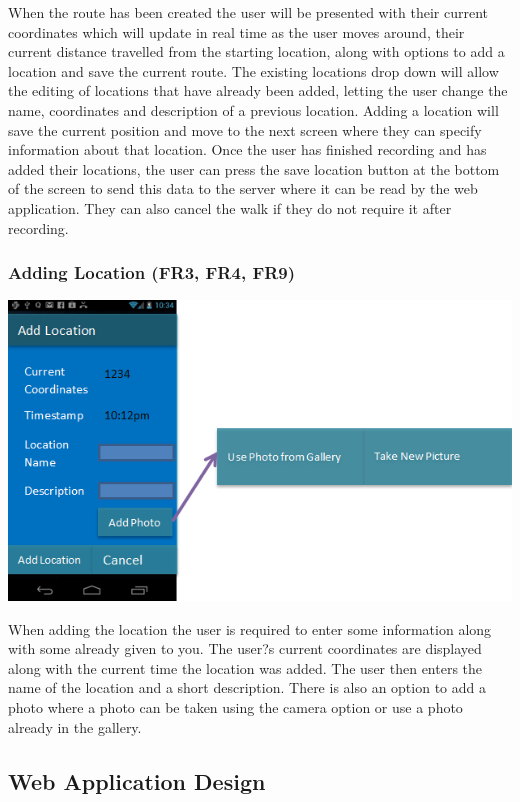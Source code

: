 \documentclass{project}
\begin{document}
When the route has been created the user will be presented with their current coordinates which will update in real 
time as the user moves around, their current distance travelled from the starting location, along with options to 
add a location and save the current route.
\bigskip
The existing locations drop down will allow the editing of locations that have already been added, 
letting the user change the name, coordinates and description of a previous location.
\bigskip
Adding a location will save the current position and move to the next screen where they can specify information about that location.
Once the user has finished recording and has added their locations, the user can press the save location button at the bottom of the 
screen to send this data to the server where it can be read by the web application. They can also cancel the walk if they do not require it after recording.

\subsubsection{Adding Location (FR3, FR4, FR9)}
\bigskip
\includegraphics{PhoneUI4}
\bigskip

When adding the location the user is required to enter some information along with some already given to you.
The user?s current coordinates are displayed along with the current time the location was added.
The user then enters the name of the location and a short description.
There is also an option to add a photo where a photo can be taken using the camera option or use a photo already in the gallery.

\subsection{Web Application Design}
\end{document}
